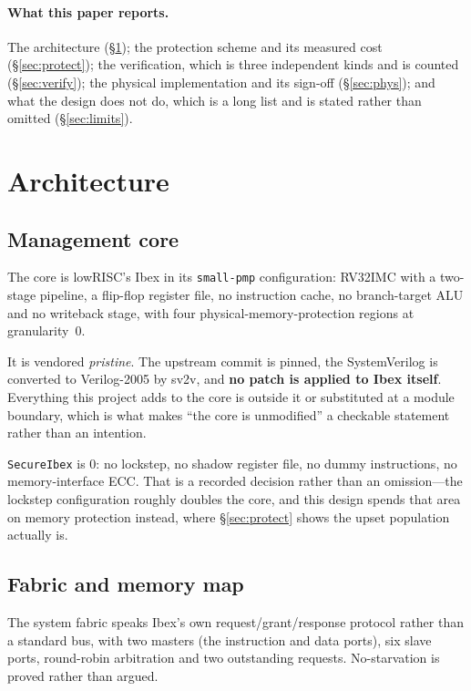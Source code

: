 \documentclass[11pt,a4paper]{article}
\begin{document}
\paragraph{What this paper reports.} The architecture
(\S\ref{sec:arch}); the protection scheme and its measured cost
(\S\ref{sec:protect}); the verification, which is three independent
kinds and is counted (\S\ref{sec:verify}); the physical implementation
and its sign-off (\S\ref{sec:phys}); and what the design does not do,
which is a long list and is stated rather than omitted
(\S\ref{sec:limits}).

\section{Architecture}
\label{sec:arch}

\subsection{Management core}

The core is lowRISC's Ibex in its \texttt{small-pmp} configuration:
RV32IMC with a two-stage pipeline, a flip-flop register file, no
instruction cache, no branch-target ALU and no writeback stage, with
four physical-memory-protection regions at granularity~\num{0}.

It is vendored \emph{pristine}. The upstream commit is pinned, the
SystemVerilog is converted to Verilog-2005 by sv2v, and \textbf{no patch
is applied to Ibex itself}. Everything this project adds to the core is
outside it or substituted at a module boundary, which is what makes
``the core is unmodified'' a checkable statement rather than an
intention.

\texttt{SecureIbex} is \num{0}: no lockstep, no shadow register file, no
dummy instructions, no memory-interface ECC. That is a recorded decision
rather than an omission---the lockstep configuration roughly doubles the
core, and this design spends that area on memory protection instead,
where \S\ref{sec:protect} shows the upset population actually is.

\subsection{Fabric and memory map}

The system fabric speaks Ibex's own request/grant/response protocol
rather than a standard bus, with two masters (the instruction and data
ports), six slave ports, round-robin arbitration and two outstanding
requests. No-starvation is proved rather than argued.
\end{document}
